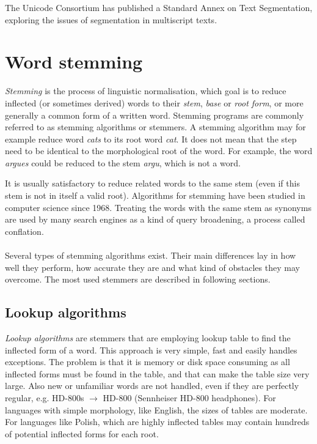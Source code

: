     The Unicode Consortium has published a Standard Annex\cite{Davis2012} on Text Segmentation, exploring the issues of segmentation in multiscript texts.

  \section{Word stemming}

    \emph{Stemming} is the process of linguistic normalisation, which goal is to reduce inflected (or sometimes derived) words to their \emph{stem}, \emph{base} or \emph{root form}, or more generally a common form of a written word.
    Stemming programs are commonly referred to as stemming algorithms or stemmers.
    A stemming algorithm may for example reduce word \emph{cats} to its root word \emph{cat}. It does not mean that the step need to be identical to the morphological root of the word. For example, the word \emph{argues} could be reduced to the stem \emph{argu}, which is not a word.

    It is usually satisfactory to reduce related words to the same stem (even if this stem is not in itself a valid root). Algorithms for stemming have been studied in computer science since 1968\cite{Lovins1968}. Treating the words with the same stem as synonyms are used by many search engines as a kind of query broadening, a process called conflation\cite{Levin2010}.
    \\\\
    Several types of stemming algorithms exist. Their main differences lay in how well they perform, how accurate they are and what kind of obstacles they may overcome. The most used stemmers are described in following sections.

    \subsection{Lookup algorithms}

      \emph{Lookup algorithms} are stemmers that are employing lookup table to find the inflected form of a word. This approach is very simple, fast and easily handles exceptions. The problem is that it is memory or disk space consuming as all inflected forms must be found in the table, and that can make the table size very large. Also new or unfamiliar words are not handled, even if they are perfectly regular, e.g. HD-800s $\to$ HD-800 (Sennheiser HD-800 headphones). For languages with simple morphology, like English, the sizes of tables are moderate. For languages like Polish, which are highly inflected tables may contain hundreds of potential inflected forms for each root.

